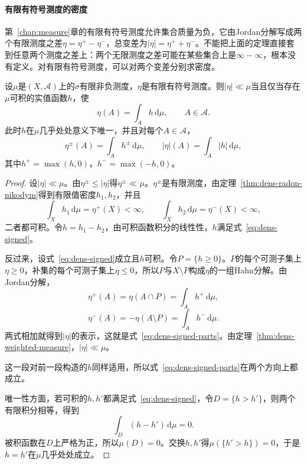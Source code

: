 \paragraph{有限有符号测度的密度}
第~\ref{chap:measure}章的有限有符号测度允许集合质量为负，它由Jordan分解写成两个有限测度之差$\eta=\eta^+-\eta^-$，总变差为$\lvert\eta\rvert=\eta^++\eta^-$。不能把上面的定理直接套到任意两个测度之差上：两个无限测度之差可能在某些集合上是$\infty-\infty$，根本没有定义。对有限有符号测度，可以对两个变差分别求密度。

\begin{theorem}[有限有符号测度的密度]
\label{thm:dens-signed}
设$\mu$是$(X,\mathcal A)$上的$\sigma$有限非负测度，$\eta$是有限有符号测度。则$\lvert\eta\rvert\ll\mu$当且仅当存在$\mu$可积的实值函数$h$，使
\begin{equation}
\eta(A)=\int_Ah\,\mathrm d\mu ,\qquad A\in\mathcal A .
\label{eq:dens-signed}
\end{equation}
此时$h$在$\mu$几乎处处意义下唯一，并且对每个$A\in\mathcal A$，
\begin{equation}
\eta^\pm(A)=\int_Ah^\pm\,\mathrm d\mu,\qquad\lvert\eta\rvert(A)=\int_A\lvert h\rvert\,\mathrm d\mu ,
\label{eq:dens-signed-parts}
\end{equation}
其中$h^+=\max(h,0)$，$h^-=\max(-h,0)$。
\end{theorem}

\begin{proof}
设$\lvert\eta\rvert\ll\mu$。由$\eta^\pm\leq\lvert\eta\rvert$得$\eta^\pm\ll\mu$。$\eta^\pm$是有限测度，由定理~\ref{thm:dens-radon-nikodym}得到有限值密度$h_1,h_2$，并且
\[
\int_Xh_1\,\mathrm d\mu=\eta^+(X)<\infty,\qquad\int_Xh_2\,\mathrm d\mu=\eta^-(X)<\infty ,
\]
二者都可积。令$h=h_1-h_2$，由可积函数积分的线性性，$h$满足式~\eqref{eq:dens-signed}。

反过来，设式~\eqref{eq:dens-signed}成立且$h$可积。令$P=\{h\geq0\}$。$P$的每个可测子集上$\eta\geq0$，补集的每个可测子集上$\eta\leq0$，所以$P$与$X\setminus P$构成$\eta$的一组Hahn分解。由Jordan分解，
\[
\eta^+(A)=\eta(A\cap P)=\int_Ah^+\,\mathrm d\mu ,
\]
\[
\eta^-(A)=-\eta(A\setminus P)=\int_Ah^-\,\mathrm d\mu .
\]
两式相加就得到$\lvert\eta\rvert$的表示，这就是式~\eqref{eq:dens-signed-parts}。由定理~\ref{thm:dens-weighted-measure}，$\lvert\eta\rvert\ll\mu$。

这一段对前一段构造的$h$同样适用，所以式~\eqref{eq:dens-signed-parts}在两个方向上都成立。

唯一性方面，若可积的$h,h'$都满足式~\eqref{eq:dens-signed}，令$D=\{h>h'\}$，则两个有限积分相等，得到
\[
\int_D(h-h')\,\mathrm d\mu=0 .
\]
被积函数在$D$上严格为正，所以$\mu(D)=0$。交换$h,h'$得$\mu(\{h'>h\})=0$，于是$h=h'$在$\mu$几乎处处成立。
\end{proof}


